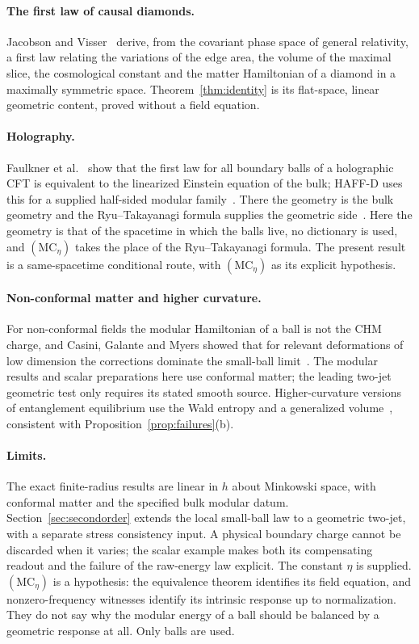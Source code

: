\documentclass[12pt]{article}
\theoremstyle{definition}
\theoremstyle{remark}
\begin{document}
\paragraph{The first law of causal diamonds.} Jacobson and Visser~\cite{JacobsonVisser2019}
derive, from the covariant phase space of general relativity, a first law relating the
variations of the edge area, the volume of the maximal slice, the cosmological constant and
the matter Hamiltonian of a diamond in a maximally symmetric space.
Theorem~\ref{thm:identity} is its flat-space, linear geometric content, proved without a
field equation.

\paragraph{Holography.} Faulkner et al.~\cite{Faulkner2014} show that the first law for
all boundary balls of a holographic CFT is equivalent to the linearized Einstein equation of
the bulk; HAFF-D uses this for a supplied half-sided modular family~\cite{HAFFD}. There the
geometry is the bulk geometry and the Ryu--Takayanagi formula supplies the geometric
side~\cite{RyuTakayanagi2006}. Here the geometry is that of the spacetime in which the
balls live, no dictionary is used, and \((\mathrm{MC}_\eta)\) takes the place of the
Ryu--Takayanagi formula. The present result is a same-spacetime conditional route, with \((\mathrm{MC}_\eta)\) as its explicit hypothesis.

\paragraph{Non-conformal matter and higher curvature.} For non-conformal fields the
modular Hamiltonian of a ball is not the CHM charge, and Casini, Galante and Myers showed
that for relevant deformations of low dimension the corrections dominate the small-ball
limit~\cite{CGM2016}. The modular results and scalar preparations here use
conformal matter; the leading two-jet geometric test only requires its
stated smooth source. Higher-curvature versions
of entanglement equilibrium use the Wald entropy and a generalized
volume~\cite{BMSV2017}, consistent with Proposition~\ref{prop:failures}(b).

\paragraph{Limits.} The exact finite-radius results are linear in \(h\) about Minkowski space,
with conformal matter and the specified bulk modular datum.
Section~\ref{sec:secondorder} extends the local small-ball law to a geometric
two-jet, with a separate stress consistency input. A physical boundary charge cannot be
discarded when it varies; the scalar example makes both its compensating readout and
the failure of the raw-energy law explicit. The constant \(\eta\) is supplied.
\((\mathrm{MC}_\eta)\) is a hypothesis:
the equivalence theorem identifies its field equation, and nonzero-frequency witnesses
identify its intrinsic response up to normalization. They do not say why the modular energy of a ball should be balanced by
a geometric response at all. Only balls are used.
\end{document}
